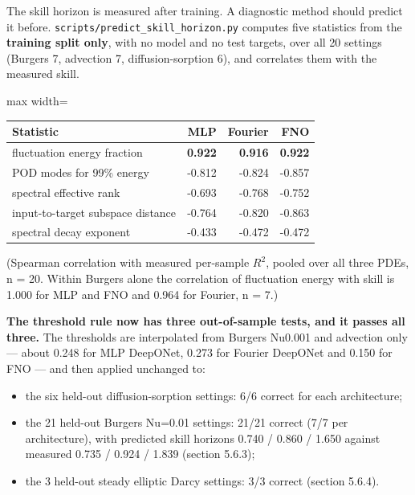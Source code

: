 \documentclass[preprint,12pt]{elsarticle}
\begin{document}
The skill horizon is measured after training. A diagnostic method should predict it before. \texttt{scripts/predict\_skill\_horizon.py} computes five statistics from the \textbf{training split only}, with no model and no test targets, over all 20 settings (Burgers 7, advection 7, diffusion-sorption 6), and correlates them with the measured skill.

\begin{center}
\begin{adjustbox}{max width=\linewidth}
\small
\begin{tabular}{lrrr}
\toprule
Statistic & MLP & Fourier & FNO \\
\midrule
fluctuation energy fraction & \textbf{0.922} & \textbf{0.916} & \textbf{0.922} \\
POD modes for 99\% energy & -0.812 & -0.824 & -0.857 \\
spectral effective rank & -0.693 & -0.768 & -0.752 \\
input-to-target subspace distance & -0.764 & -0.820 & -0.863 \\
spectral decay exponent & -0.433 & -0.472 & -0.472 \\
\bottomrule
\end{tabular}
\end{adjustbox}
\end{center}


(Spearman correlation with measured per-sample $R^2$, pooled over all three PDEs, n = 20. Within Burgers alone the correlation of fluctuation energy with skill is 1.000 for MLP and FNO and 0.964 for Fourier, n = 7.)

\textbf{The threshold rule now has three out-of-sample tests, and it passes all three.} The thresholds are interpolated from Burgers Nu0.001 and advection only --- about 0.248 for MLP DeepONet, 0.273 for Fourier DeepONet and 0.150 for FNO --- and then applied unchanged to:

\begin{itemize}
\item the six held-out diffusion-sorption settings: 6/6 correct for each architecture;
\item the 21 held-out Burgers Nu=0.01 settings: 21/21 correct (7/7 per architecture), with predicted skill horizons 0.740 / 0.860 / 1.650 against measured 0.735 / 0.924 / 1.839 (section 5.6.3);
\item the 3 held-out steady elliptic Darcy settings: 3/3 correct (section 5.6.4).
\end{itemize}
\end{document}
